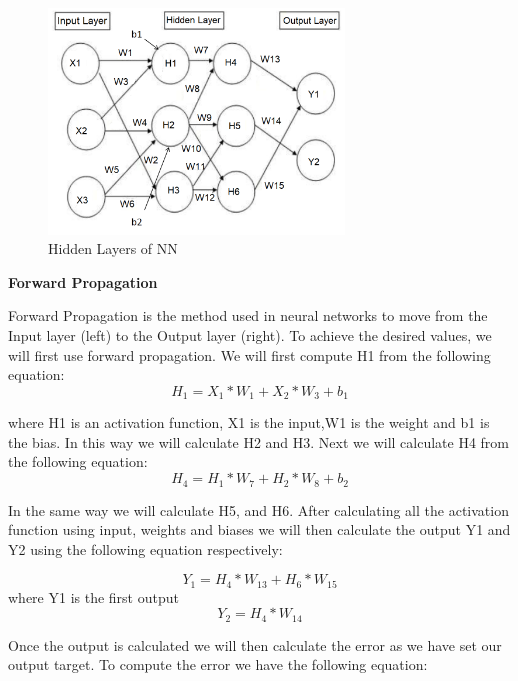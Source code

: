 \begin{figure}[h!]
    \centering
    \includegraphics[width=0.7\textwidth]{img/propagation.png}
    \caption{Hidden Layers of NN}
    \label{fig:nn-hiddenlayer}
\end{figure}

\textbf{Forward Propagation}

Forward Propagation is the method used in neural networks to move from the Input layer (left) to the Output layer (right). To achieve the desired values, we will first use forward propagation. We will first compute H1 from the following equation:
\begin{equation}
H_{1}=X_{1}*W_{1}+X_{2}*W_{3}+b_{1}    
\end{equation}

where H1 is an activation function, X1 is the input,W1 is the weight and b1 is the bias. In this way we will calculate H2 and H3. Next we will calculate H4 from the following equation:
\begin{equation}
H_{4}=H_{1}*W_{7}+H_{2}*W_{8}+b_{2}    
\end{equation}

In the same way we will calculate H5, and H6. After calculating all the activation function using input, weights and biases we will then calculate the output Y1 and Y2 using the following equation respectively:

\begin{equation}
 Y_{1}=H_{4}*W_{13}+H_{6}*W_{15}   
\end{equation}
where Y1 is the first output
\begin{equation}
Y_{2} = H_{4}*W_{14}    
\end{equation}

Once the output is calculated we will then calculate the error as we have set our output target. To compute the error we have the following equation:

